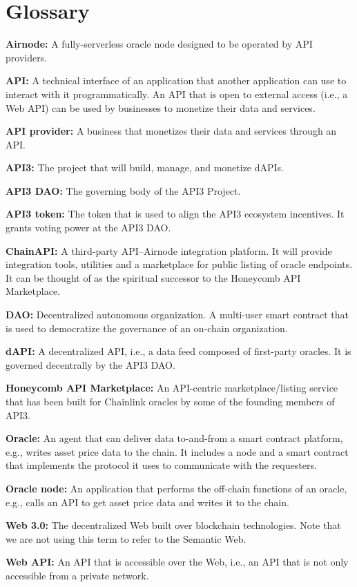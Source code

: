 \documentclass[11pt]{article}
\begin{document}
\section{Glossary}

\textbf{Airnode:} A fully-serverless oracle node designed to be operated by API providers.

\textbf{API:} A technical interface of an application that another application can use to interact with it programmatically.
An API that is open to external access (i.e., a Web API) can be used by businesses to monetize their data and services.

\textbf{API provider:} A business that monetizes their data and services through an API.

\textbf{API3:} The project that will build, manage, and monetize dAPIs.

\textbf{API3 DAO:} The governing body of the API3 Project.

\textbf{API3 token:} The token that is used to align the API3 ecosystem incentives.
It grants voting power at the API3 DAO.

\textbf{ChainAPI:} A third-party API--Airnode integration platform.
It will provide integration tools, utilities and a marketplace for public listing of oracle endpoints.
It can be thought of as the spiritual successor to the Honeycomb API Marketplace.

\textbf{DAO:} Decentralized autonomous organization.
A multi-user smart contract that is used to democratize the governance of an on-chain organization.

\textbf{dAPI:} A decentralized API, i.e., a data feed composed of first-party oracles.
It is governed decentrally by the API3 DAO.

\textbf{Honeycomb API Marketplace:} An API-centric marketplace/listing service that has been built for Chainlink oracles by some of the founding members of API3.

\textbf{Oracle:} An agent that can deliver data to-and-from a smart contract platform, e.g., writes asset price data to the chain.
It includes a node and a smart contract that implements the protocol it uses to communicate with the requesters.

\textbf{Oracle node:} An application that performs the off-chain functions of an oracle, e.g., calls an API to get asset price data and writes it to the chain.

\textbf{Web 3.0:} The decentralized Web built over blockchain technologies.
Note that we are not using this term to refer to the Semantic Web.

\textbf{Web API:} An API that is accessible over the Web, i.e., an API that is not only accessible from a private network.
\end{document}
